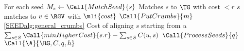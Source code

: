 \begin{algorithm}[t]
\begin{algorithmic}[1]
            \Comment For each seed
				\State $M_s \gets \Call{MatchSeed}{s}$
                \Comment Matches $s$ to $\TG$ with cost $<r$
                \Comment $s$ matches to $v \in \RGV$ with $\mli{cost}$
                    \State $\Call{PutCrumbs}{m}$
					\Comment \cref{SEEDalg:general_crumbs}
                \EndFor
			\EndFor
		\EndFunction
		\Statex
		\Comment Cost of aligning $s$ starting from $u$
			\State \Return $\sum_{s \in S} \Call{minHigherCost}{s.r} - \sum_{s \in S} C(u,s)$
		\EndFunction
        \Statex
         \label{SEEDlin:align}
            \State $\Call{ProcessSeeds}{q}$
            \State $\Call{\A}{\RG, C, q, h}$
        \EndFunction
	\end{algorithmic}
\end{algorithm}

